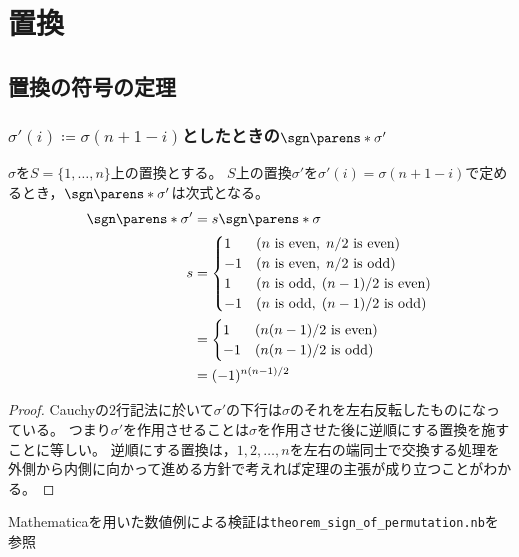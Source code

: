 \chapter{置換}
    \section{置換の符号の定理}
        \subsection{\texorpdfstring{$\sigma'(i) \coloneq \sigma(n+1-i)$としたときの$\sgn\parens*{\sigma'}$}{σ'(i) := σ(n+1-i)としたときのsgn(σ')}}
            \label{置換の引数を逆順にしたときの符号}
            \begin{shadebox}
                $\sigma$を$S=\{1,\dotsc,n\}$上の置換とする。
                $S$上の置換$\sigma'$を$\sigma'(i) = \sigma(n+1-i)$で定めるとき，$\sgn\parens*{\sigma'}$は次式となる。
                \begin{align*}
                    \sgn\parens*{\sigma'} &= s\sgn\parens*{\sigma} \\
                    s &=
                    \begin{cases}
                        1 & (n \text{ is even},\; n/2 \text{ is even}) \\
                        -1 & (n \text{ is even},\; n/2 \text{ is odd}) \\
                        1 & (n \text{ is odd},\; (n-1)/2 \text{ is even}) \\
                        -1 & (n \text{ is odd},\; (n-1)/2 \text{ is odd})
                    \end{cases} \\
                    &=
                    \begin{cases}
                        1 & (n(n-1)/2 \text{ is even}) \\
                        -1 & (n(n-1)/2 \text{ is odd})
                    \end{cases} \\
                    &= (-1)^{n(n-1)/2}
                \end{align*}
            \end{shadebox}
            \begin{proof}
                \quad\par
                Cauchyの2行記法に於いて$\sigma'$の下行は$\sigma$のそれを左右反転したものになっている。
                つまり$\sigma'$を作用させることは$\sigma$を作用させた後に逆順にする置換を施すことに等しい。
                逆順にする置換は，$1,2,\dotsc,n$を左右の端同士で交換する処理を外側から内側に向かって進める方針で考えれば定理の主張が成り立つことがわかる。
            \end{proof}
            Mathematicaを用いた数値例による検証は\verb|theorem_sign_of_permutation.nb|を参照
